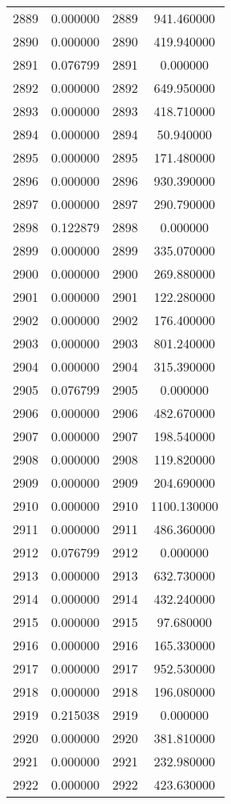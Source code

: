 \documentclass[12pt]{article}
\begin{document}
\begin{longtable}{@{}cccc@{}}
2889 & 0.000000 & 2889 & 941.460000 \\
2890 & 0.000000 & 2890 & 419.940000 \\
2891 & 0.076799 & 2891 & 0.000000 \\
2892 & 0.000000 & 2892 & 649.950000 \\
2893 & 0.000000 & 2893 & 418.710000 \\
2894 & 0.000000 & 2894 & 50.940000 \\
2895 & 0.000000 & 2895 & 171.480000 \\
2896 & 0.000000 & 2896 & 930.390000 \\
2897 & 0.000000 & 2897 & 290.790000 \\
2898 & 0.122879 & 2898 & 0.000000 \\
2899 & 0.000000 & 2899 & 335.070000 \\
2900 & 0.000000 & 2900 & 269.880000 \\
2901 & 0.000000 & 2901 & 122.280000 \\
2902 & 0.000000 & 2902 & 176.400000 \\
2903 & 0.000000 & 2903 & 801.240000 \\
2904 & 0.000000 & 2904 & 315.390000 \\
2905 & 0.076799 & 2905 & 0.000000 \\
2906 & 0.000000 & 2906 & 482.670000 \\
2907 & 0.000000 & 2907 & 198.540000 \\
2908 & 0.000000 & 2908 & 119.820000 \\
2909 & 0.000000 & 2909 & 204.690000 \\
2910 & 0.000000 & 2910 & 1100.130000 \\
2911 & 0.000000 & 2911 & 486.360000 \\
2912 & 0.076799 & 2912 & 0.000000 \\
2913 & 0.000000 & 2913 & 632.730000 \\
2914 & 0.000000 & 2914 & 432.240000 \\
2915 & 0.000000 & 2915 & 97.680000 \\
2916 & 0.000000 & 2916 & 165.330000 \\
2917 & 0.000000 & 2917 & 952.530000 \\
2918 & 0.000000 & 2918 & 196.080000 \\
2919 & 0.215038 & 2919 & 0.000000 \\
2920 & 0.000000 & 2920 & 381.810000 \\
2921 & 0.000000 & 2921 & 232.980000 \\
2922 & 0.000000 & 2922 & 423.630000 \\

\end{longtable}
\end{document}
